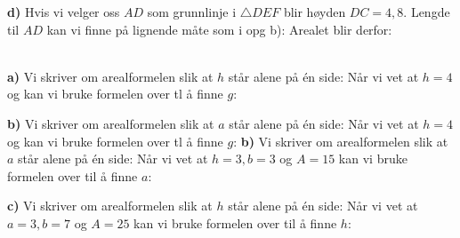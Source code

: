 \textbf{d)} Hvis vi velger oss $ {AD} $ som grunnlinje i $ \triangle DEF $ blir høyden $ {DC=4,8} $. Lengde til $ AD $ kan vi finne på lignende måte som i opg b):
Arealet blir derfor: \vs
{}\vsk

\\
\textbf{a)} Vi skriver om arealformelen slik at $ h $ står alene på én side: 
Når vi vet at $ {h=4} $ og  kan vi bruke formelen over tl å finne $ g $:

\textbf{b)} Vi skriver om arealformelen slik at $ a $ står alene på én side: 
Når vi vet at $ {h=4} $ og  kan vi bruke formelen over tl å finne $ g $:
\textbf{b)} Vi skriver om arealformelen slik at $ a $ står alene på én side: 
Når vi vet at $ {h=3, b=3} $ og $ A= 15$ kan vi bruke formelen over til å finne $ a $:
\os

\textbf{c)} Vi skriver om arealformelen slik at $ h $ står alene på én side: 
Når vi vet at $ {a=3, b=7} $ og $ A= 25$ kan vi bruke formelen over til å finne $ h $:


